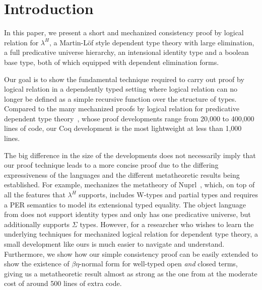 \documentclass[acmsmall,screen=true,
\ifpublic review=false\else,review=true\fi
  ,anonymous=\ifanonymous true\else false\fi]{acmart}
\newcommand{\lang}{$\lambda^H$\xspace}
\begin{document}
\maketitle

\section{Introduction}
In this paper, we present a short and mechanized consistency proof by
logical relation for \lang{}, a Martin-Löf style dependent type theory
with large elimination, a full predicative universe hierarchy, an
intensional identity type and a boolean base type, both of which
equipped with dependent elimination forms. %

Our goal is to show the fundamental technique required to carry out proof by logical
relation in a dependently typed setting where logical relation can no
longer be defined as a simple recursive function over the structure of
types. Compared to the many mechanized proofs by logical relation for
predicative dependent type
theory~\citep{nbeincoq,decagda,martin-lof-a-la-coq,anand2014towards},
whose proof developments range from 20,000 to 400,000 lines of code,
our Coq development is the most lightweight at less than 1,000 lines.

The big difference in the size of the developments does not
necessarily imply that our proof technique leads to a more concise
proof due to the differing expressiveness of the languages and the
different metatheoretic results being established. For
example, \citet{anand2014towards} mechanizes the metatheory of
Nuprl~\citep{constable1986implementing}, which, on top of all the
features that \lang{} supports, includes W-types and partial types and
requires a PER semantics to model its extensional typed
equality. The object language from \citet{decagda} does not support
identity types and only has one predicative universe, but additionally
supports $\Sigma$ types. However, for a researcher who wishes to learn
the underlying techniques for mechanized logical relation for
dependent type theory, a small development like ours is much easier to
navigate and understand. Furthermore, we show how our simple
consistency proof can be easily extended to show the existence of
$\beta\eta$-normal form for well-typed open \emph{and} closed terms,
giving us a metatheoretic result almost as strong as the one from
\citet{decagda} at the moderate cost of around 500 lines of extra code.
\end{document}
